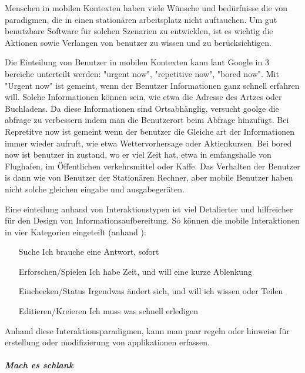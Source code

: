 
Menschen in mobilen Kontexten haben viele Wünsche und bedürfnisse die von paradigmen, die in einen stationären arbeitsplatz nicht auftauchen. Um gut benutzbare Software für solchen Szenarien zu entwicklen, ist es wichtig die Aktionen sowie Verlangen von benutzer zu wissen und zu berücksichtigen. 

Die Einteilung von Benutzer in mobilen Kontexten kann laut Google in 3 bereiche unterteilt werden: "urgent now", "repetitive now", "bored now"\cite{googleUsers}. Mit "Urgent now" ist gemeint, wenn der Benutzer Informationen ganz schnell erfahren will. Solche Informationen können sein, wie etwa die Adresse des Artzes oder Buchladens. Da diese Informationen sind Ortsabhänglig, versucht goolge die abfrage zu verbessern indem man die Benutzerort beim Abfrage hinzufügt. Bei Repretitve now ist gemeint wenn der benutzer die Gleiche art der Informationen immer wieder aufruft, wie etwa Wettervorhersage oder Aktienkursen. Bei bored now ist benutzer in zustand, wo er viel Zeit hat, etwa in emfangshalle von Flughafen, im Öffentlichen verkehrsmittel  oder Kaffe. Das Verhalten der Benutzer is dann wie von Benutzer der Stationären Rechner, aber mobile Benutzer haben nicht solche gleichen eingabe und ausgabegeräten.

Eine einteilung anhand von Interaktionstypen ist viel Detalierter und hilfreicher für den Design von Informationsaufbereitung. So können die mobile Interaktionen in vier Kategorien eingeteilt (anhand \cite[Seite 50]{mobileFirst}):

\begin{itemize}
 	\item[Suche] Ich brauche eine Antwort, sofort
 	\item[Erforschen/Spielen] Ich habe Zeit, und will eine kurze Ablenkung
 	\item[Einchecken/Status] Irgendwas ändert sich, und will ich wissen oder Teilen
 	\item[Editieren/Kreieren] Ich muss was schnell erledigen
 \end{itemize} 

Anhand diese Interaktionsparadigmen, kann man paar regeln oder hinweise für erstellung oder modifizierung von applikationen erfassen.

\subparagraph{Mach es schlank} 
\label{subp:entferne_das_fett}

